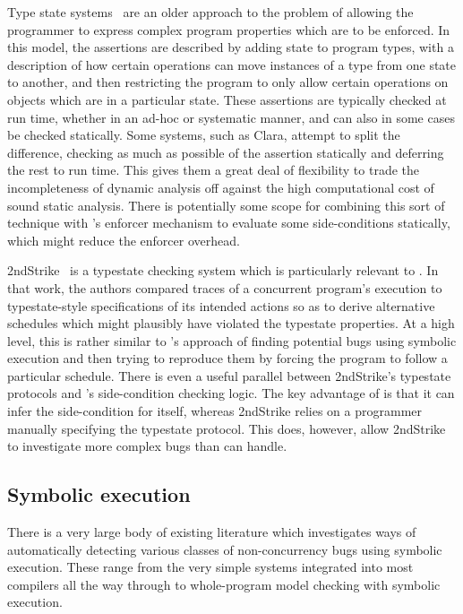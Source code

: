 Type state systems~\cite{Strom1986a} are an older approach to the
problem of allowing the programmer to express complex program
properties which are to be enforced.  In this model, the assertions
are described by adding state to program types, with a description of
how certain operations can move instances of a type from one state to
another, and then restricting the program to only allow certain
operations on objects which are in a particular state.  These
assertions are typically checked at run time\cite{Wolff2011}, whether
in an ad-hoc\cite[pages~305--314]{Gamma1995} or
systematic\cite{Aldrich2009} manner, and can also in some cases be
checked statically\cite{Lam2005}.  Some systems, such as
Clara\cite{Bodden2010}, attempt to split the difference, checking as much as
possible of the assertion statically and deferring the rest to run
time.  This gives them a great deal of flexibility to trade the
incompleteness of dynamic analysis off against the high computational
cost of sound static analysis.  There is potentially some scope for
combining this sort of technique with {\technique}'s enforcer
mechanism to evaluate some side-conditions statically, which might
reduce the enforcer overhead.

2ndStrike~\cite{Gao2011} is a typestate checking system which is
particularly relevant to {\technique}.  In that work, the authors
compared traces of a concurrent program's execution to typestate-style
specifications of its intended actions so as to derive alternative
schedules which might plausibly have violated the typestate
properties.  At a high level, this is rather similar to {\technique}'s
approach of finding potential bugs using symbolic execution and then
trying to reproduce them by forcing the program to follow a particular
schedule.  There is even a useful parallel between 2ndStrike's
typestate protocols and {\technique}'s side-condition checking logic.
The key advantage of {\technique} is that it can infer the
side-condition for itself, whereas 2ndStrike relies on a programmer
manually specifying the typestate protocol.  This does, however, allow
2ndStrike to investigate more complex bugs than {\technique} can
handle.

\subsection{Symbolic execution}

There is a very large body of existing literature which investigates
ways of automatically detecting various classes of non-concurrency
bugs using symbolic execution.  These range from the very simple
systems integrated into most compilers\needCite{} all the way through
to whole-program model checking with symbolic
execution\cite{Ball2011}.  

